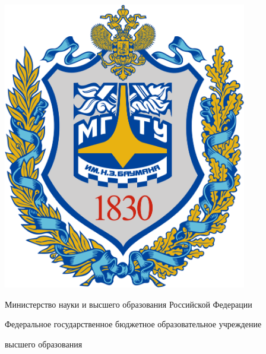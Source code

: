 
\begin{titlepage}
\thispagestyle{empty}

\ifx\wauthor\undefined\providecommand{\wauthorspace}{\vspace{7pt}}\fi

\providecommand{\wauthorspace}{}
\providecommand{\wtype}
{РАСЧЕТНО-ПОЯСНИТЕЛЬНАЯ ЗАПИСКА

\bigskip

К КУРСОВОМУ ПРОЕКТУ

\bigskip

НА ТЕМУ:

\bigskip
}
\providecommand{\wauthor}{}
\providecommand{\wgroup}{}
\providecommand{\wfirstlead}{}
\providecommand{\wauthorfull}{}
\providecommand{\wleadprefix}{Руководитель курсового проекта}



\begin{minipage}{0.15\textwidth}
\centering
\includegraphics[width=0.8\textwidth]{images/logo.png}
\end{minipage}
\begin{minipage}{0.8\textwidth}
\fontsize{10}{15}
\centering
\bfseries

Министерство науки и высшего образования Российской
Федерации

Федеральное государственное бюджетное образовательное учреждение

высшего образования


\end{minipage}
\end{titlepage}
